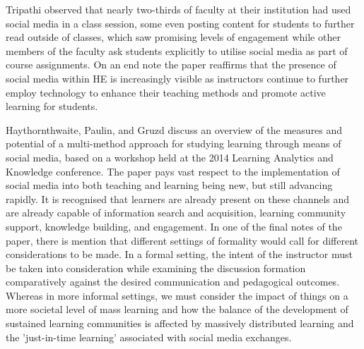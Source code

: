 \documentclass[lettersize,journal]{IEEEtran}
\begin{document}
    Tripathi \cite{Tripathi 2022} observed that nearly two-thirds of faculty at
    their institution had used social media in a class session, some even
    posting content for students to further read outside of classes, which saw
    promising levels of engagement while other members of the faculty ask students
    explicitly to utilise social media as part of course assignments. On an end
    note the paper reaffirms that the presence of social media within HE is
    increasingly visible as instructors continue to further employ technology
    to enhance their teaching methods and promote active learning for students.

    Haythornthwaite, Paulin, and Gruzd \cite{Haythornthwaite et al 2016} discuss
    an overview of the measures and potential of a multi-method approach for studying learning
    through means of social media, based on a workshop held at the 2014 Learning
    Analytics and Knowledge conference. The paper pays vast respect to the
    implementation of social media into both teaching and learning being new,
    but still advancing rapidly. It is recognised that learners are already
    present on these channels and are already capable of information search and
    acquisition, learning community support, knowledge building, and engagement.
    In one of the final notes of the paper, there is mention that different
    settings of formality would call for different considerations to be made. In
    a formal setting, the intent of the instructor must be taken into
    consideration while examining the discussion formation comparatively against
    the desired communication and pedagogical outcomes. Whereas in more informal
    settings, we must consider the impact of things on a more societal level of
    mass learning and how the balance of the development of sustained learning
    communities is affected by massively distributed learning and the
    'just-in-time learning' associated with social media exchanges.
\end{document}
